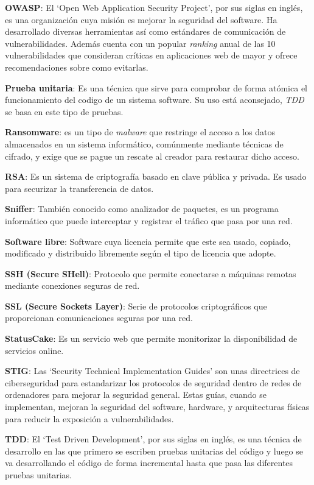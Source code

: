 \textbf{OWASP}: El `Open Web Application Security Project', por sus siglas en inglés, es una organización cuya misión es mejorar la seguridad del software. Ha desarrollado diversas herramientas así como estándares de comunicación de vulnerabilidades. Además cuenta con un popular \textit{ranking} anual de las 10 vulnerabilidades que consideran críticas en aplicaciones web de mayor y ofrece recomendaciones sobre como evitarlas.
\bigskip

\textbf{Prueba unitaria}: Es una técnica que sirve para comprobar de forma atómica el funcionamiento del codigo de un sistema software. Su uso está aconsejado, \textit{TDD} se basa en este tipo de pruebas.
\bigskip

\textbf{Ransomware}: es un tipo de \textit{malware} que restringe el acceso a los datos almacenados en un sistema informático, comúnmente mediante técnicas de cifrado, y exige que se pague un rescate al creador para restaurar dicho acceso.
\bigskip

\textbf{RSA}: Es un sistema de criptografía basado en clave pública y privada. Es usado para securizar la transferencia de datos.
\bigskip

\textbf{Sniffer}: También conocido como analizador de paquetes, es un programa informático que puede interceptar y registrar el tráfico que pasa por una red.
\bigskip

\textbf{Software libre}: Software cuya licencia permite que este sea usado, copiado, modificado y distribuido libremente según el tipo de licencia que adopte.
\bigskip

\textbf{SSH (Secure SHell)}: Protocolo que permite conectarse a máquinas remotas mediante conexiones seguras de red.
\bigskip

\textbf{SSL (Secure Sockets Layer)}: Serie de protocolos criptográficos que proporcionan comunicaciones seguras por una red.
\bigskip

\textbf{StatusCake}: Es un servicio web que permite monitorizar la disponibilidad de servicios online.
\bigskip

\textbf{STIG}: Las `Security Technical Implementation Guides' son unas directrices de ciberseguridad para estandarizar los protocolos de seguridad dentro de redes de ordenadores para mejorar la seguridad general. Estas guías, cuando se implementan, mejoran la seguridad del software, hardware, y arquitecturas físicas para reducir la exposición a vulnerabilidades.
\bigskip

\textbf{TDD}: El `Test Driven Development', por sus siglas en inglés, es una técnica de desarrollo en las que primero se escriben pruebas unitarias del código y luego se va desarrollando el código de forma incremental hasta que pasa las diferentes pruebas unitarias.
\bigskip

